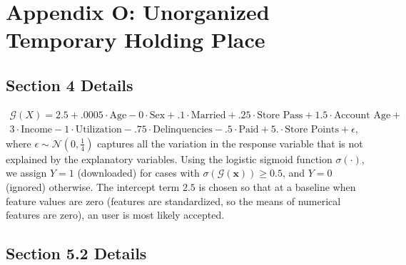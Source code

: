 \documentclass[mnsc,blindrev]{informs3}
\begin{document}
\section*{Appendix O: Unorganized Temporary Holding Place}
    \subsection{Section 4 Details}

       \begin{equation}
    \label{eqn:gt}
    \begin{split}
    \mathcal{G}(X) =2.5 +.0005\cdot\text{Age} -0\cdot\text{Sex} +.1 \cdot \text{Married} + .25\cdot \text{Store Pass} + 1.5 \cdot \text{Account Age} + \\   3 \cdot \text{Income} - 1\cdot\text{Utilization} -.75 \cdot \text{Delinquencies} - .5\cdot\text{Paid} + 5.\cdot\text{Store Points} + \epsilon,
    \end{split}
    \end{equation}
    \noindent where $\epsilon \sim \mathcal{N}(0,\frac{1}{4})$ captures all the variation in the response variable that is not explained by the explanatory variables.
    Using the logistic sigmoid function $\sigma(\cdot)$, we assign $Y = 1$ (downloaded) for cases with $\sigma(\mathcal{G}(\mathbf{x}))\geq 0.5$, and $Y = 0$ (ignored) otherwise. The intercept term $2.5$ is chosen so that at a baseline when feature values are zero (features are standardized, so the means of numerical features are zero), an user is most likely accepted. %

    \subsection*{Section 5.2 Details}
        
\end{document}
